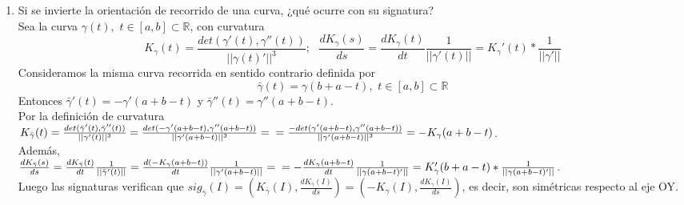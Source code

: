 \documentclass[12pt,a4paper]{article}
\newcommand{\todo}[1]{{\large \color{red} \textbf{TODO: }#1 }}
\begin{document}
\begin{enumerate}
  \newpage{}
\item Si se invierte la orientación de recorrido de una curva, ¿qué ocurre
  con su signatura?\\
  Sea la curva $\gamma(t),\,\, t\in[a,b]\subset\mathbb{R}$, con curvatura
  $$K_{\gamma}(t)=\frac{det(\gamma'(t), \gamma''(t))}{||\gamma(t)'||^{3}};\,\,\,\,
  \frac{dK_{\gamma}(s)}{ds} = \frac{dK_{\gamma}(t)}{dt}
  \frac{1}{||\gamma'(t)||} = K_{\gamma}'(t) * \frac{1}{||\gamma'||} $$
  Consideramos la misma curva recorrida en sentido contrario definida por
  $$\bar{\gamma}(t) = \gamma(b+a-t),\,\, t\in[a,b]\subset\mathbb{R}$$
  Entonces $\bar{\gamma}'(t)=-\gamma'(a+b-t)$ y
  $\bar{\gamma}''(t) = \gamma''(a+b-t)$.\\ Por la definición de curvatura\\
  $K_{\bar{\gamma}}(t) = \frac{det(\bar{\gamma}'(t),
    \bar{\gamma}''(t))}{||\gamma'(t)||^{3}} = \frac{det(-\gamma'(a+b-t),
    \gamma''(a+b-t))}{||\gamma'(a+b-t)||^{3}} =\\= \frac{- det(\gamma'(a+b-t),
    \gamma''(a+b-t))}{||\gamma'(a+b-t)||^{3}} = -K_{\gamma}(a+b-t)$.\\
  Además,\\
  $\frac{dK_{\bar{\gamma}}(s)}{ds} = \frac{dK_{\bar{\gamma}}(t)}{dt}
  \frac{1}{||\bar{\gamma}'(t)||} = \frac{d(-K_{\gamma}(a+b-t))}{dt}
  \frac{1}{||\gamma'(a+b-t)||} = \\=-\frac{dK_{\gamma}(a+b-t)}{dt}
  \frac{1}{||\gamma(a+b-t)'||} = K_{\gamma}'(b+a-t) *
  \frac{1}{||\gamma(a+b-t)'||}$.\\

  Luego las signaturas verifican que $sig_{\bar{\gamma}}(I) = (K_{\bar{\gamma}}(I),
  \frac{dK_{\bar{\gamma}}(I)}{ds}) = (- K_{\gamma}(I),
  \frac{dK_{\gamma}(I)}{ds})$, es decir, son simétricas respecto
  al eje OY.
\end{enumerate}
\end{document}
